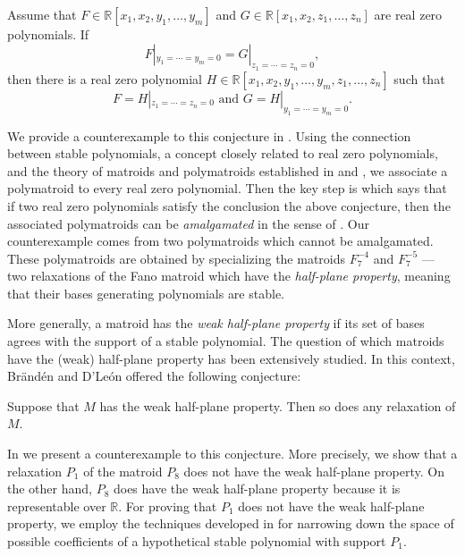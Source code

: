 \documentclass[11pt]{article}
\theoremstyle{definition}
\numberwithin{equation}{section}
\newcommand{\R}{{\mathbb R}}
\begin{document}
\begin{con*}
    Assume that $F\in\R[x_1,x_2,y_1,\ldots,y_m]$ and $G\in\R[x_1,x_2,z_1,\ldots,z_n]$ are real zero polynomials. If
    \begin{equation*}
        F|_{y_1=\cdots=y_m=0}=G|_{z_1=\cdots=z_n=0},
    \end{equation*}
    then there is a real zero polynomial $H\in\R[x_1,x_2,y_1,\ldots,y_m,z_1,\ldots,z_n]$ such that
    \begin{equation*}
        F=H|_{z_1=\cdots=z_n=0}\textrm{ and }G=H|_{y_1=\cdots=y_m=0}.
    \end{equation*}
\end{con*}

We provide a counterexample to this conjecture in . Using the connection between stable polynomials, a concept closely related to real zero polynomials, and the theory of matroids and polymatroids established in \cite{HPPlong} and \cite{BrandenHPP}, we associate a polymatroid to every real zero polynomial. Then the key step is  which says that if two real zero polynomials satisfy the conclusion the above conjecture, then the associated polymatroids can be \emph{amalgamated} in the sense of . Our counterexample comes from two polymatroids which cannot be amalgamated. These polymatroids are obtained by specializing the matroids $F_7^{-4}$ and $F_7^{-5}$ --- two relaxations of the Fano matroid which have the \emph{half-plane property}, meaning that their bases generating polynomials are stable. 

More generally, a matroid has the \emph{weak half-plane property} if its set of bases agrees with the support of a stable polynomial. The question of which matroids have the (weak) half-plane property has been extensively studied. In this context, Br\"and\'en and D'Le\'on offered the following conjecture:

\begin{con*}
    Suppose that $M$ has the weak half-plane property. Then so does any relaxation of $M$.
\end{con*}

In  we present a counterexample to this conjecture. More precisely, we show that a relaxation $P_1$ of the matroid $P_8$ does not have the weak half-plane property. On the other hand, $P_8$ does have the weak half-plane property because it is representable over $\R$. For proving that $P_1$ does not have the weak half-plane property, we employ the techniques developed in \cite{BrandenDLeon} for narrowing down the space of possible coefficients of a hypothetical stable polynomial with support $P_1$.
\end{document}
